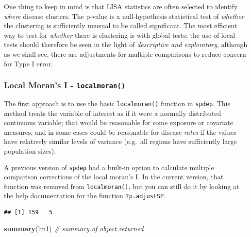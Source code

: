 \documentclass[
]{book}
\newenvironment{Shaded}{\begin{snugshade}}{\end{snugshade}}
\newcommand{\AttributeTok}[1]{\textcolor[rgb]{0.13,0.29,0.53}{#1}}
\newcommand{\CommentTok}[1]{\textcolor[rgb]{0.56,0.35,0.01}{\textit{#1}}}
\newcommand{\FunctionTok}[1]{\textcolor[rgb]{0.13,0.29,0.53}{\textbf{#1}}}
\newcommand{\NormalTok}[1]{#1}
\newcommand{\OtherTok}[1]{\textcolor[rgb]{0.56,0.35,0.01}{#1}}
\newcommand{\SpecialCharTok}[1]{\textcolor[rgb]{0.81,0.36,0.00}{\textbf{#1}}}
\begin{document}
One thing to keep in mind is that LISA statistics are often selected to identify \emph{where} disease clusters. The p-value is a null-hypothesis statistical test of \emph{whether} the clustering is sufficiently unusual to be called significant. The most efficient way to test for \emph{whether} there is clustering is with global tests; the use of local tests should therefore be seen in the light of \emph{descriptive and exploratory}, although as we shall see, there are adjustments for multiple comparisons to reduce concern for Type I error.

\hypertarget{local-morans-i---localmoran}{%
\subsubsection{\texorpdfstring{Local Moran's I - \texttt{localmoran()}}{Local Moran's I - localmoran()}}\label{local-morans-i---localmoran}}

The first approach is to use the basic \texttt{localmoran()} function in \texttt{spdep}. This method treats the variable of interest as if it were a normally distributed continuous variable; that would be reasonable for some exposure or covariate measures, and in some cases could be reasonable for disease \emph{rates} if the values have relatively similar levels of variance (e.g.~all regions have sufficiently large population sizes).

A previous version of \texttt{spdep} had a built-in option to calculate multiple comparison corrections of the local moran's I. In the current version, that function was removed from \texttt{localmoran()}, but you can still do it by looking at the help documentation for the function \texttt{?p.adjustSP}.

\begin{Shaded}
\end{Shaded}

\begin{verbatim}
## [1] 159   5
\end{verbatim}

\begin{Shaded}
\begin{Highlighting}[]
\FunctionTok{summary}\NormalTok{(lm1)  }\CommentTok{\# summary of object returned}
\end{Highlighting}
\end{Shaded}
\end{document}
